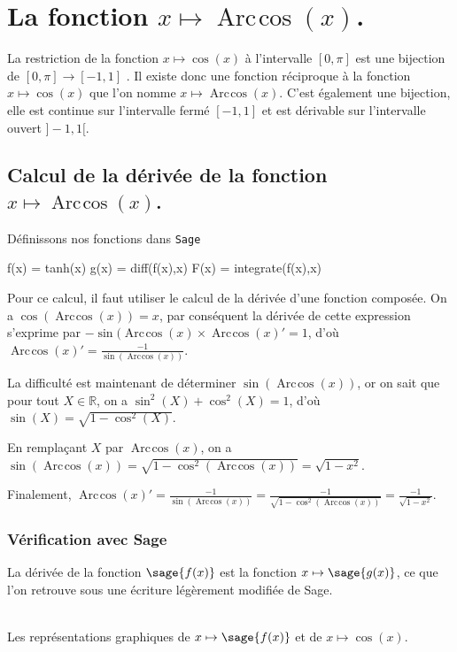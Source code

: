 \documentclass[a4paper,landscape,17pt]{extreport} %
\def\eclaire{\mathbb}
\def\R{\ensuremath{\eclaire R}}
\renewcommand{\arccos}{\mathop{\mathrm{Arc\mspace{2mu}cos}}}
\begin{document}
\section{La fonction  $x \mapsto \arccos(x) $.}


La restriction de la fonction $x \mapsto \cos(x) $ à l'intervalle $[0,\pi]$ est une bijection de $[0,\pi] \rightarrow [-1,1]$ . Il existe donc une fonction réciproque à la fonction $x \mapsto \cos(x) $ que l'on nomme $x \mapsto \arccos(x) $. C'est également une bijection, elle est continue sur l'intervalle fermé  $ [-1,1]$ et est dérivable sur l'intervalle ouvert $]-1,1[$.

\subsection{Calcul de la dérivée de la fonction $x \mapsto \arccos(x) $.}

Définissons nos fonctions dans {\texttt{Sage}}
\begin{sageblock}
    f(x) = tanh(x)
    g(x) = diff(f(x),x)
    F(x) = integrate(f(x),x)
\end{sageblock}


Pour ce calcul, il faut utiliser le calcul de la dérivée d'une fonction composée. On a $\cos(\arccos(x))=x$, par conséquent la dérivée de cette expression s'exprime par $ -\sin(\arccos(x) \times \arccos(x)' = 1$, d'où $\arccos(x)' = \frac{-1}{\sin(\arccos(x))} $.

La difficulté est maintenant de déterminer $\sin(\arccos(x))$, or on sait que pour tout $X \in \R$, on a $\sin^2(X) + \cos^2(X) = 1$, d'où $\sin(X) = \sqrt{1-\cos^2(X)}$.

En remplaçant $X$ par $\arccos(x)$, 
on a $\sin(\arccos(x)) = \sqrt{1-\cos^2(\arccos(x))} = \sqrt{1- x^2}$.

Finalement, $\arccos(x)' = \frac{-1}{\sin(\arccos(x))} = \frac{-1}{\sqrt{1-\cos^2(\arccos(x))}} =  \frac{-1}{\sqrt{1- x^2}} $.

\subsubsection*{Vérification avec Sage}


La dérivée de la fonction $\sage{f(x)}$ est la fonction $x \mapsto \sage{g(x)} $, ce que l'on retrouve sous une écriture légèrement modifiée de Sage.


\begin{center}
\\
Les représentations graphiques de $x \mapsto \sage{f(x)} $ et de $x\mapsto \cos(x)$.
\end{center}
\end{document}
